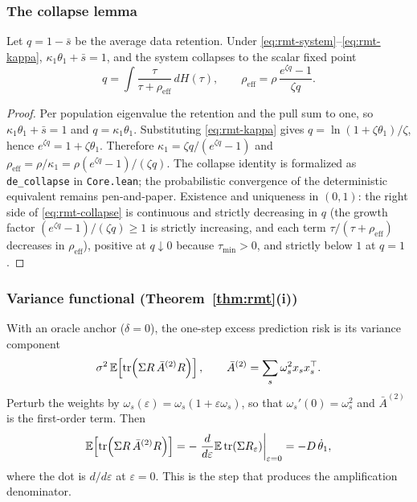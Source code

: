 \subsubsection{The collapse lemma}
\label{app:rmt-collapse}

\begin{lemma}[Collapse]
\label{lem:rmt-collapse}
Let $q = 1 - \bar s$ be the average data retention. Under \eqref{eq:rmt-system}--\eqref{eq:rmt-kappa}, $\kappa_1 \theta_1 + \bar s = 1$, and the system collapses to the scalar fixed point
\begin{equation}
\label{eq:rmt-collapse}
q = \int \frac{\tau}{\tau + \rho_{\mathrm{eff}}}\, dH(\tau),
\qquad
\rho_{\mathrm{eff}} = \rho\,\frac{e^{\zeta q} - 1}{\zeta q}.
\end{equation}
\end{lemma}

\begin{proof}
Per population eigenvalue the retention and the pull sum to one, so $\kappa_1 \theta_1 + \bar s = 1$ and $q = \kappa_1 \theta_1$.
Substituting \eqref{eq:rmt-kappa} gives $q = \ln(1 + \zeta \theta_1)/\zeta$, hence $e^{\zeta q} = 1 + \zeta \theta_1$.
Therefore $\kappa_1 = \zeta q/(e^{\zeta q} - 1)$ and
$\rho_{\mathrm{eff}} = \rho/\kappa_1 = \rho (e^{\zeta q} - 1)/(\zeta q)$.
The collapse identity is formalized as \texttt{de\_collapse} in \texttt{Core.lean}; the probabilistic convergence of the deterministic equivalent remains pen-and-paper.
Existence and uniqueness in $(0,1)$: the right side of \eqref{eq:rmt-collapse} is continuous and strictly decreasing in $q$ (the growth factor $(e^{\zeta q}-1)/(\zeta q) \ge 1$ is strictly increasing, and each term $\tau/(\tau + \rho_{\mathrm{eff}})$ decreases in $\rho_{\mathrm{eff}}$), positive at $q \downarrow 0$ because $\tau_{\min} > 0$, and strictly below $1$ at $q = 1$.
\end{proof}

\subsubsection{Variance functional (Theorem~\ref{thm:rmt}(i))}
\label{app:rmt-variance}

With an oracle anchor ($\delta = 0$), the one-step excess prediction risk is its variance component
\begin{equation}
\label{eq:rmt-variance}
\sigma^2\,\mathbb{E}\!\left[\operatorname{tr}\!\left(\Sigma R\, \bar A^{(2)} R\right)\right],
\qquad
\bar A^{(2)} = \sum_s \omega_s^2 x_s x_s^\top .
\end{equation}
Perturb the weights by $\omega_s(\varepsilon) = \omega_s(1 + \varepsilon \omega_s)$, so that $\omega_s'(0) = \omega_s^2$ and $\bar A^{(2)}$ is the first-order term.
Then
\begin{equation}
\label{eq:rmt-derivative}
\mathbb{E}\!\left[\operatorname{tr}\!\left(\Sigma R\, \bar A^{(2)} R\right)\right]
= -\left.\frac{d}{d\varepsilon}\mathbb{E}\operatorname{tr}\!\left(\Sigma R_\varepsilon\right)\right|_{\varepsilon=0}
= -D\,\dot\theta_1,
\end{equation}
where the dot is $d/d\varepsilon$ at $\varepsilon = 0$.
This is the step that produces the amplification denominator.

